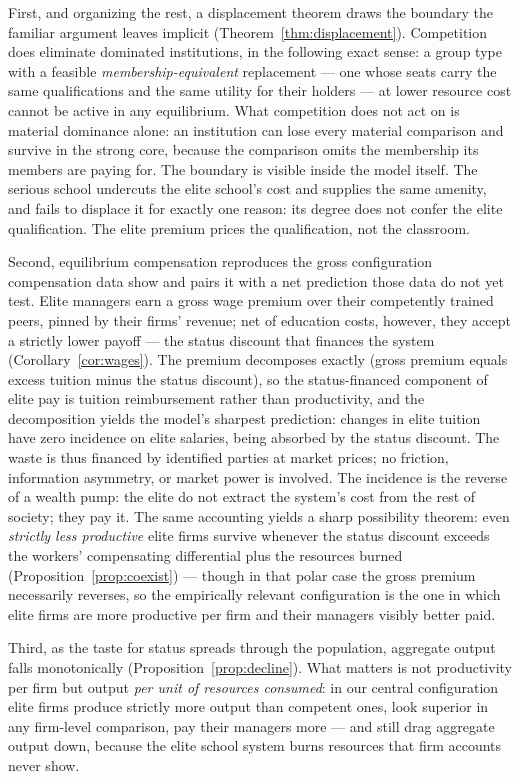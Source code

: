 \documentclass[12pt,letterpaper]{article}
\theoremstyle{definition}
\begin{document}
First, and organizing the rest, a displacement theorem draws the boundary the familiar argument leaves implicit (Theorem~\ref{thm:displacement}).
Competition does eliminate dominated institutions, in the following exact sense: a group type with a feasible \emph{membership-equivalent} replacement --- one whose seats carry the same qualifications and the same utility for their holders --- at lower resource cost cannot be active in any equilibrium.
What competition does not act on is material dominance alone: an institution can lose every material comparison and survive in the strong core, because the comparison omits the membership its members are paying for.
The boundary is visible inside the model itself.
The serious school undercuts the elite school's cost and supplies the same amenity, and fails to displace it for exactly one reason: its degree does not confer the elite qualification.
The elite premium prices the qualification, not the classroom.

Second, equilibrium compensation reproduces the gross configuration compensation data show and pairs it with a net prediction those data do not yet test.
Elite managers earn a gross wage premium over their competently trained peers, pinned by their firms' revenue; net of education costs, however, they accept a strictly lower payoff --- the status discount that finances the system (Corollary~\ref{cor:wages}).
The premium decomposes exactly (gross premium equals excess tuition minus the status discount), so the status-financed component of elite pay is tuition reimbursement rather than productivity, and the decomposition yields the model's sharpest prediction: changes in elite tuition have zero incidence on elite salaries, being absorbed by the status discount.
The waste is thus financed by identified parties at market prices; no friction, information asymmetry, or market power is involved.
The incidence is the reverse of a wealth pump: the elite do not extract the system's cost from the rest of society; they pay it.
The same accounting yields a sharp possibility theorem: even \emph{strictly less productive} elite firms survive whenever the status discount exceeds the workers' compensating differential plus the resources burned (Proposition~\ref{prop:coexist}) --- though in that polar case the gross premium necessarily reverses, so the empirically relevant configuration is the one in which elite firms are more productive per firm and their managers visibly better paid.

Third, as the taste for status spreads through the population, aggregate output falls monotonically (Proposition~\ref{prop:decline}).
What matters is not productivity per firm but output \emph{per unit of resources consumed}: in our central configuration elite firms produce strictly more output than competent ones, look superior in any firm-level comparison, pay their managers more --- and still drag aggregate output down, because the elite school system burns resources that firm accounts never show.
\end{document}
